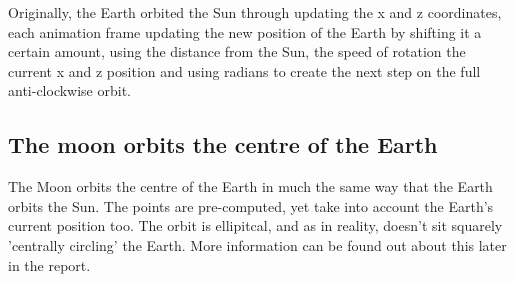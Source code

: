\documentclass[12pt]{article}
\begin{document}
Originally, the Earth orbited the Sun through updating the x and z coordinates, each animation frame updating the new position of the Earth by shifting it a certain amount, using the distance from the Sun, the speed of rotation the current x and z position and using radians to create the next step on the full anti-clockwise orbit.

\subsection{The moon orbits the centre of the Earth}
The Moon orbits the centre of the Earth in much the same way that the Earth orbits the Sun. The points are pre-computed, yet take into account the Earth's current position too. The orbit is ellipitcal, and as in reality, doesn't sit squarely 'centrally circling' the Earth. More information can be found out about this later in the report.
\end{document}
